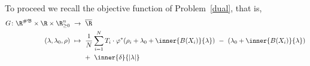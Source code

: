 To proceed we recall the objective function of Problem~\ref{dual}, that is,
\begin{align*}
  G\colon
  \R^{\#\mathfrak{B}}
  \times
  \R
  \times
  \R^n_{\ge 0}
  &
  \ 
  \to
  \ 
  \overline{\R}
  \\
  \left( 
    \lambda,
    \lambda_0,
    \rho
  \right)
  &
  \ 
  \mapsto
  \ 
    \frac{1}{N}
\sum_{i=1} 
  ^N
    T_i
    \cdot
  \varphi^*
  \!
  \left( 
    \rho_i
    +
\lambda_0
+
\inner
{B(X_i)}
{
\lambda
}
  \right)
  \ 
  -
  \ 
  \left( 
\lambda_0
+
\inner
{B(X_i)}
{
\lambda
}
  \right)
  \\
  &
  \qquad 
+
\ 
\inner
{\delta}
{
  |\lambda|
}
\end{align*}

